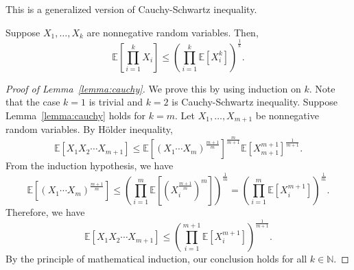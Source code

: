 This is a generalized version of Cauchy-Schwartz inequality.
\begin{lemma}\label{lemma:cauchy}
Suppose $X_1, \dots, X_k$ are nonnegative random variables. Then, 
\begin{equation*}
    \mathbb{E}\left [\prod_{i=1}^k X_i \right ] \leq \left( \prod_{i=1}^k \mathbb{E}\left[X_i^k\right]\right)^{\frac{1}{k}}.
\end{equation*}
\end{lemma}
\begin{proof}[Proof of Lemma~\ref{lemma:cauchy}]
We prove this by using induction on $k$. Note that the case $k=1$ is trivial and $k=2$ is Cauchy-Schwartz inequality. Suppose Lemma~\ref{lemma:cauchy} holds for $k=m$. Let $X_1, \dots, X_{m+1}$ be nonnegative random variables. By H\"older inequality, 
\begin{equation*}
    \mathbb{E}[X_1X_2 \cdots X_{m+1}] \leq \mathbb{E}\left[(X_1 \cdots X_m)^{\frac{m+1}{m}}\right]^\frac{m}{m+1}\mathbb{E}\left[X_{m+1}^{m+1}\right]^{\frac{1}{m+1}}.
\end{equation*}
From the induction hypothesis, we have
\begin{equation*}
    \mathbb{E} \left [(X_1 \cdots X_m)^{\frac{m+1}{m}} \right ] \leq \left( \prod_{i=1}^m \mathbb{E}\left [\left (X_i^\frac{m+1}{m}\right)^m \right] \right)^\frac{1}{m}= \left( \prod_{i=1}^m \mathbb{E}\left [X_i^{m+1} \right] \right)^\frac{1}{m}.
\end{equation*}
Therefore, we have 
\begin{equation*}
    \mathbb{E}[X_1X_2 \cdots X_{m+1}] \leq \left( \prod_{i=1}^{m+1} \mathbb{E}\left [X_i^{m+1} \right] \right)^\frac{1}{m+1}.
\end{equation*}
By the principle of mathematical induction, our conclusion holds for all $k \in \mathbb{N}$.
\end{proof}

